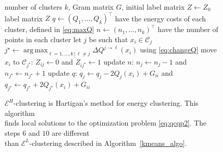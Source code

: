 \documentclass[aps,preprint,nofootinbib,floatfix]{revtex4-1}
\DeclareMathOperator*{\argmax}{arg\,max}
\newcommand\C{{\mathcal{C}}}
\begin{document}
\begin{figure}
\begin{flushleft}
\begin{algorithm}[H]
\vspace{.5em}
\begin{algorithmic}[1]
    \INPUT number of clusters $k$, Gram matrix $G$, 
                initial label matrix $Z \leftarrow Z_0$
    \OUTPUT label matrix $Z$
  \STATE $q \leftarrow (Q_1, \dotsc, Q_k)^\top$ 
            have the energy costs of each cluster, defined in \eqref{eq:maxQ}
  \STATE $n \leftarrow (n_1,\dotsc,n_k)^\top$ have the number of points 
        in each cluster%
  \REPEAT
        \STATE let $j$ be such that $x_i \in \C_j$
        \STATE $j^\star \leftarrow \argmax_{\ell=1,\dotsc,k \, | \, \ell\ne j} 
                \Delta Q^{j\to \ell}(x_i)$
            using \eqref{eq:changeQ} \label{stepmove}
            \STATE move $x_i$ to $\C_{j^\star}$: $Z_{ij} \leftarrow 0$ and 
            $Z_{ij^\star} \leftarrow 1$
            \STATE update $n$: $n_j \leftarrow n_j - 1$ and
                    $n_{j^\star} \leftarrow n_{j^\star} + 1$
            \STATE update $q$: $q_j \leftarrow q_j - 2Q_j(x_i) + G_{ii}$ and
    $q_{j^\star} \leftarrow q_{j^\star} + 2Q_{j^\star}(x_i)+ G_{ii}$
        \ENDIF
    \ENDFOR
\end{algorithmic}
\caption{\label{algo}
$\mathcal{E}^H$-clustering is Hartigan's method for energy clustering.
This algorithm~~~~~~ \\ finds local solutions to  
the optimization problem \eqref{eq:qcqp2}.
The steps $6$ and $10$ are different~~~~~~~~ \\
than $\mathcal{E}^L$-clustering
described in Algorithm~\ref{kmeans_algo}. \hspace{\fill}
}
\end{algorithm}
\end{flushleft}
\end{figure}
\end{document}
